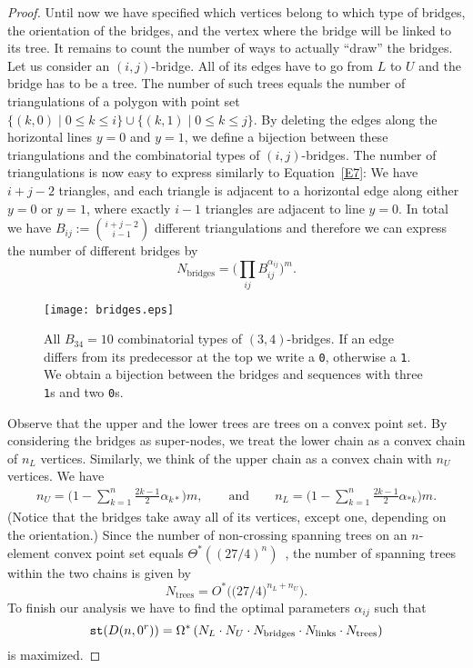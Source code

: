 \documentclass[11pt]{article}
\def\st{{\tt st}}
\begin{document}
\begin{proof}
Until now we have specified which vertices belong to which type of
bridges, the orientation of the bridges, and the vertex where the
bridge will be linked to its tree. It remains to count the number of
ways to actually ``draw'' the bridges. Let us consider an
$(i,j)$-bridge. All of its edges have to go from $L$ to $U$ and the bridge
has to be a tree. The number of such trees equals the number of
triangulations of a polygon with point set $\{(k,0) \; | \; 0\leq k
\leq i\} \cup \{ (k,1)\; | \; 0\leq k \leq j\}$. By deleting the
edges along the horizontal lines $y=0$ and $y=1$, we define a bijection
between these triangulations and the combinatorial types of $(i,j)$-bridges.
The number of triangulations is now easy to express similarly to Equation~\eqref{E7}:
We have $i+j-2$ triangles, and each triangle is adjacent to a horizontal edge
along either $y=0$ or $y=1$, where exactly $i-1$ triangles are adjacent to line $y=0$.
In total we have $B_{ij}:={ i+j-2 \choose i-1 }$ different
triangulations and therefore
we can express the number of different bridges by
\[N_{\text{bridges}}=\Big( \prod_{ij} B_{ij}^{\alpha_{ij}} \Big)^m.\]

\begin{figure}[htbp]
\centerline{ \texttt{[image: bridges.eps]}}
\caption{All $B_{34}=10$ combinatorial types of
  $(3,4)$-bridges. If an edge differs from its predecessor at the top
  we write a
{\tt 0}, otherwise a {\tt 1}. We obtain a bijection between the
bridges and sequences with three {\tt 1}s and two {\tt 0}s.}
\label{fig:bridges}
\end{figure}

Observe that the upper and the lower trees are trees on a convex point set.
By considering the bridges as super-nodes, we treat the lower chain as
a convex chain of $n_L$ vertices. Similarly, we think of the upper chain as
a convex chain with $n_U$ vertices.
We have
\begin{align*}
n_U=\Big(1-\sum_{k=1}^n
\frac{2k-1}{2} \alpha_{k*}\Big)m, \qquad \text{and} \qquad
n_L=\Big(1-\sum_{k=1}^n \frac{2k-1}{2} \alpha_{*k}\Big)m.
\end{align*}
 (Notice that the bridges take away all of its vertices, except one,
depending on the orientation.) Since the number of non-crossing
spanning trees on an $n$-element convex point set equals
$\Theta^*((27/4)^n)$~\cite{FN99}, the number of
spanning trees within the two chains is given by
\[N_{\text{trees}}=O^*\Big( \Big( 27/4 \Big) ^{n_L+n_U}\Big).\]
To finish our analysis we have to find the optimal parameters
$\alpha_{ij}$ such that
\begin{equation}\label{eq:LBST} \st(D(n,0^r))=\Omega^*\left( N_L
\cdot N_U \cdot N_{\text{bridges}} \cdot N_{\text{links}} \cdot
N_{\text{trees}} \right)
\end{equation}
is maximized.


\end{proof}
\end{document}
